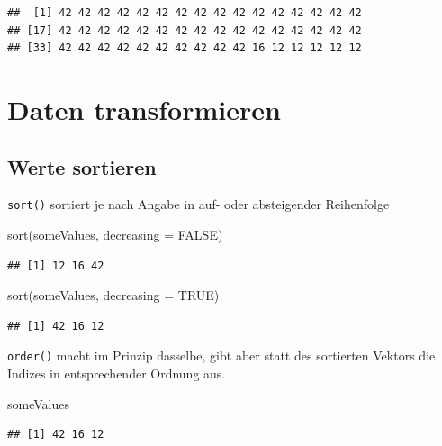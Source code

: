 \documentclass[
]{book}
\newenvironment{Shaded}{\begin{snugshade}}{\end{snugshade}}
\newcommand{\AttributeTok}[1]{\textcolor[rgb]{0.77,0.63,0.00}{#1}}
\newcommand{\ConstantTok}[1]{\textcolor[rgb]{0.00,0.00,0.00}{#1}}
\newcommand{\FunctionTok}[1]{\textcolor[rgb]{0.00,0.00,0.00}{#1}}
\newcommand{\NormalTok}[1]{#1}
\begin{document}
\begin{verbatim}
##  [1] 42 42 42 42 42 42 42 42 42 42 42 42 42 42 42 42
## [17] 42 42 42 42 42 42 42 42 42 42 42 42 42 42 42 42
## [33] 42 42 42 42 42 42 42 42 42 42 16 12 12 12 12 12
\end{verbatim}

\hypertarget{daten-transformieren}{%
\section{Daten transformieren}\label{daten-transformieren}}

\hypertarget{werte-sortieren}{%
\subsection{Werte sortieren}\label{werte-sortieren}}

\texttt{sort()} sortiert je nach Angabe in auf- oder absteigender Reihenfolge

\begin{Shaded}
\begin{Highlighting}[]
\FunctionTok{sort}\NormalTok{(someValues, }\AttributeTok{decreasing =} \ConstantTok{FALSE}\NormalTok{)}
\end{Highlighting}
\end{Shaded}

\begin{verbatim}
## [1] 12 16 42
\end{verbatim}

\begin{Shaded}
\begin{Highlighting}[]
\FunctionTok{sort}\NormalTok{(someValues, }\AttributeTok{decreasing =} \ConstantTok{TRUE}\NormalTok{)}
\end{Highlighting}
\end{Shaded}

\begin{verbatim}
## [1] 42 16 12
\end{verbatim}

\texttt{order()} macht im Prinzip dasselbe, gibt aber statt des sortierten Vektors die Indizes in entsprechender Ordnung aus.

\begin{Shaded}
\begin{Highlighting}[]
\NormalTok{someValues}
\end{Highlighting}
\end{Shaded}

\begin{verbatim}
## [1] 42 16 12
\end{verbatim}
\end{document}
